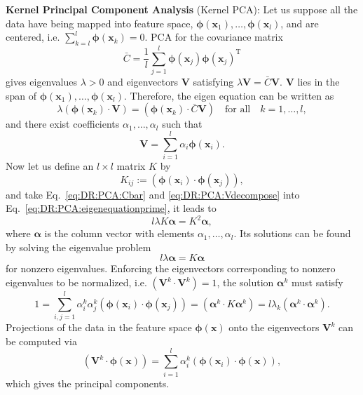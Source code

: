 \textbf{Kernel Principal Component Analysis}\cite{ScholkopfNC1998} (Kernel PCA): Let us suppose all the data have being mapped into feature space, $\boldsymbol{\phi}(\mathbf{x}_1),\dots,\boldsymbol{\phi}(\mathbf{x}_l)$, and are centered, i.e. $\sum_{k=l}^l \boldsymbol{\phi}(\mathbf{x}_k)=0$. PCA for the covariance matrix
\begin{equation}
	\bar{C}=\frac{1}{l}\sum_{j=1}^l \boldsymbol{\phi}(\mathbf{x}_j)\boldsymbol{\phi}(\mathbf{x}_j)^{\operatorname{T}}
	\label{eq:DR:PCA:Cbar}
\end{equation}
gives eigenvalues $\lambda >0$ and eigenvectors $\mathbf{V}$ satisfying $\lambda \mathbf{V}=\bar{C} \mathbf{V}$. $\mathbf{V}$ lies in the span of $\boldsymbol{\phi}(\mathbf{x}_1),\dots,\boldsymbol{\phi}(\mathbf{x}_l)$. Therefore, the eigen equation can be written as
\begin{equation}
	\lambda (\boldsymbol{\phi}(\mathbf{x}_k)\cdot \mathbf{V})=(\boldsymbol{\phi}(\mathbf{x}_k)\cdot \bar{C}\mathbf{V}) \quad \text{for all}\quad k=1,\dots,l,
	\label{eq:DR:PCA:eigenequationprime}
\end{equation}
and there exist coefficients $\alpha_1,\dots,\alpha_l$ such that
\begin{equation}
	\mathbf{V}=\sum_{i=1}^l \alpha_i \boldsymbol{\phi}(\mathbf{x}_i).
	\label{eq:DR:PCA:Vdecompose}
\end{equation}
Now let us define an $l \times l$ matrix $K$ by
\begin{equation}
	K_{ij} :=(\boldsymbol{\phi}(\mathbf{x}_i)\cdot \boldsymbol{\phi}(\mathbf{x}_j)),
\end{equation}
and take Eq.~\ref{eq:DR:PCA:Cbar} and \ref{eq:DR:PCA:Vdecompose} into Eq.~\ref{eq:DR:PCA:eigenequationprime}, it leads to
\begin{equation}
	l\lambda K\boldsymbol{\alpha} =K^2\boldsymbol{\alpha},
\end{equation}
where $\boldsymbol{\alpha}$ is the column vector with elements $\alpha_1,\dots,\alpha_l$. Its solutions can be found by solving the eigenvalue problem
\begin{equation}
	l\lambda \boldsymbol{\alpha} =K\boldsymbol{\alpha}
	\label{eq:DR:PCA:eigenequatiionK}
\end{equation}
for nonzero eigenvalues. Enforcing the eigenvectors corresponding to nonzero eigenvalues to be normalized, i.e. $(\mathbf{V}^k\cdot \mathbf{V}^k)=1$, the solution $\boldsymbol{\alpha}^k$ must satisfy
\begin{equation}
	1=\sum_{i,j=1}^l \alpha_i^k\alpha_j^k(\boldsymbol{\phi}(\mathbf{x}_i)\cdot \boldsymbol{\phi}(\mathbf{x}_j))=(\boldsymbol{\alpha}^k\cdot K\boldsymbol{\alpha}^k)=l\lambda_k(\boldsymbol{\alpha}^k\cdot \boldsymbol{\alpha}^k).
	\label{eq:DR:PCA:normalizingAlpha}
\end{equation}
Projections of the data in the feature space $\boldsymbol{\phi}(\mathbf{x})$ onto the eigenvectors $\mathbf{V}^k$ can be computed via
\begin{equation}
	(\mathbf{V}^k\cdot \boldsymbol{\phi}(\mathbf{x}))=\sum_{i=1}^l\alpha_i^k(\boldsymbol{\phi}(\mathbf{x}_i)\cdot \boldsymbol{\phi}(\mathbf{x})),
	\label{eq:DR:PCA:kPC}
\end{equation}
which gives the principal components.

